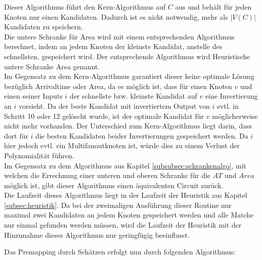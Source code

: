\documentclass[11pt, a4paper, german]{article}
\begin{document}
Dieser Algorithmus führt den Kern-Algorithmus  auf $C$ aus und behält für jeden Knoten nur einen Kandidaten. Dadurch ist es nicht notwendig, mehr als $|V(C)|$ Kandidaten zu speichern. \\
 Die untere Schranke für Area wird mit einem entsprechenden Algorithmus berechnet, indem an jedem Knoten der kleinste Kandidat, anstelle des schnellsten, gespeichert wird. Der entsprechende Algorithmus wird Heuristische untere Schranke Area genannt. \\
Im Gegensatz zu dem Kern-Algorithmus garantiert dieser keine optimale Lösung bezüglich Arrivaltime oder Area, da es möglich ist, dass für einen Knoten $v$ und einen seiner Inputs $i$ der schnellste bzw. kleinste Kandidat auf $v$ eine Invertierung an $i$ vorsieht. Da der beste Kandidat mit invertiertem Output von $i$ evtl. in Schritt 10  oder 12 gelöscht wurde, ist der optimale Kandidat für $v$ möglicherweise nicht mehr vorhanden. Der Unterschied zum Kern-Algorithmus liegt darin, dass dort für $i$ die besten Kandidaten beider Invertierungen gespeichert werden. Da $i$ hier jedoch evtl. ein Multifanoutknoten ist, würde dies zu einem Verlust der Polynomialität führen.\\
Im Gegensatz zu dem Algorithmus aus Kapitel \ref{subsubsec:schrankenalgo}, mit welchen die Errechnung einer unteren und oberen Schranke f\"ur die $AT$ und $Area$ m\"oglich ist, gibt dieser Algorithmus einen \"aquivalenten Circuit zur\"uck.\\
Die Laufzeit dieses Algorithmus liegt in der Laufzeit der Heuristik aus Kapitel \ref{subsec:heuristik}. Da bei der zweimaligen Ausf\"uhrung dieser Routine nur maximal zwei Kandidaten an jedem Knoten gespeichert werden und alle Matche nur einmal gefunden werden müssen, wird die Laufzeit der Heuristik mit der Hinzunahme dieses Algorithmus nur geringfügig beeinflusst.

Das Premapping durch Schätzen erfolgt nun durch folgenden Algorithmus:\\
 
\end{document}
